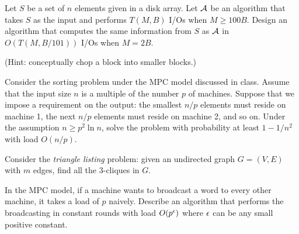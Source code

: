 \vgap

Let $S$ be a set of $n$ elements given in a disk array. Let $\mathcal{A}$ be an algorithm that takes $S$ as the input and performs $T(M, B)$ I/Os when $M \ge 100B$. Design an algorithm that computes the same information from $S$ as $\mathcal{A}$ in $O(T(M, B/101))$ I/Os when $M = 2B$.

\vgap

(Hint: conceptually chop a block into smaller blocks.)

 Consider the sorting problem under the MPC model discussed in class. Assume that the input size $n$ is a multiple of the number $p$ of machines. Suppose that we impose a requirement on the output: the smallest $n/p$ elements must reside on machine 1, the next $n/p$ elements must reside on machine 2, and so on. Under the assumption $n \ge p^2 \ln n$, solve the problem with probability at least $1 - 1/n^2$ with load $O(n/p)$.

 Consider the {\em triangle listing} problem: given an undirected graph $G = (V, E)$ with $m$ edges, find all the 3-cliques in $G$.


 In the MPC model, if a machine wants to broadcast a word to every other machine, it takes a load of $p$ naively. Describe an algorithm that performs the broadcasting in constant rounds with load $O(p^\epsilon)$ where $\epsilon$ can be any small positive constant.

